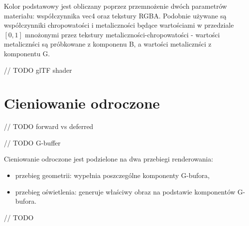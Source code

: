 Kolor podstawowy jest obliczany poprzez przemnożenie dwóch parametrów materiału: współczynnika vec4 oraz tekstury RGBA.
Podobnie używane są współczynniki chropowatości i metaliczności będące wartościami w przedziale $\left[0,1\right]$ mnożonymi przez tekstury metaliczności-chropowatości - wartości metalicznści są próbkowane z komponenu B, a wartości metalicznści z komponentu G.

// TODO glTF shader

\section{Cieniowanie odroczone}

// TODO forward vs deferred

// TODO G-buffer

Cieniowanie odroczone jest podzielone na dwa przebiegi renderowania:
\begin{itemize}
	\item przebieg geometrii: wypełnia poszczególne komponenty G-bufora,
	\item przebieg oświetlenia: generuje właściwy obraz na podstawie komponentów G-bufora.
\end{itemize}

// TODO 

